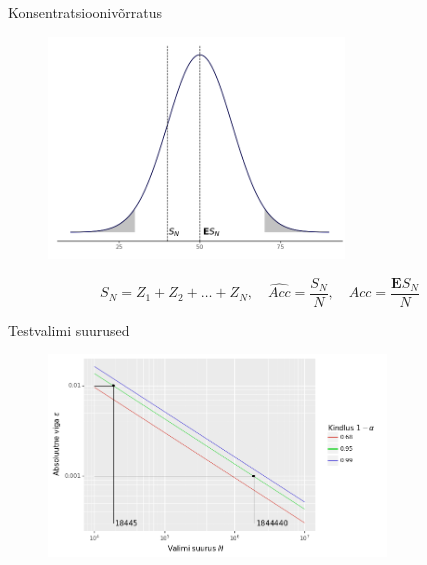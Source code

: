 \documentclass{beamer}
\newcommand{\accuracy}{Acc}
\begin{document}
\begin{frame}{Konsentratsioonivõrratus}
    \begin{figure}[H]
            \includegraphics[width=0.7\textwidth]{konsentratsioonivorratus.png}
        \end{figure}
    \begin{equation*}
        S_N = Z_1 + Z_2 + \dots + Z_N , \quad \widehat{\accuracy} = \frac{S_N}{N} , \quad \accuracy = \frac{\mathbf{E} S_N}{N}
    \end{equation*}
\end{frame}

\begin{frame}{Testvalimi suurused}
    \begin{figure}[H]
        \includegraphics[width=0.8\textwidth]{hoeffding_absoluutne_viga.png}
        \label{fig:höffding absoluutne viga}
    \end{figure}
\end{frame}
\end{document}
